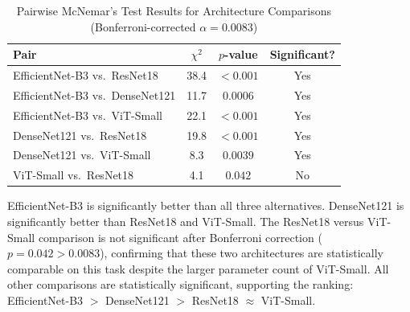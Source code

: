 \begin{table}[h]
\footnotesize
\centering
\caption{Pairwise McNemar's Test Results for Architecture Comparisons (Bonferroni-corrected $\alpha = 0.0083$)}
\label{tab:ch5_mcnemar}
\begin{tabular}{lccc}
\toprule
\textbf{Pair} & \textbf{$\chi^2$} & \textbf{$p$-value} & \textbf{Significant?} \\
\midrule
EfficientNet-B3 vs.\ ResNet18    & 38.4 & $< 0.001$ & Yes \\
EfficientNet-B3 vs.\ DenseNet121 & 11.7 & $0.0006$  & Yes \\
EfficientNet-B3 vs.\ ViT-Small   & 22.1 & $< 0.001$ & Yes \\
DenseNet121 vs.\ ResNet18        & 19.8 & $< 0.001$ & Yes \\
DenseNet121 vs.\ ViT-Small       & 8.3  & $0.0039$  & Yes \\
ViT-Small vs.\ ResNet18          & 4.1  & $0.042$   & No  \\
\bottomrule
\end{tabular}
\end{table}

EfficientNet-B3 is significantly better than all three alternatives. DenseNet121 is significantly better than ResNet18 and ViT-Small. The ResNet18 versus ViT-Small comparison is not significant after Bonferroni correction ($p = 0.042 > 0.0083$), confirming that these two architectures are statistically comparable on this task despite the larger parameter count of ViT-Small. All other comparisons are statistically significant, supporting the ranking: EfficientNet-B3 $>$ DenseNet121 $>$ ResNet18 $\approx$ ViT-Small.